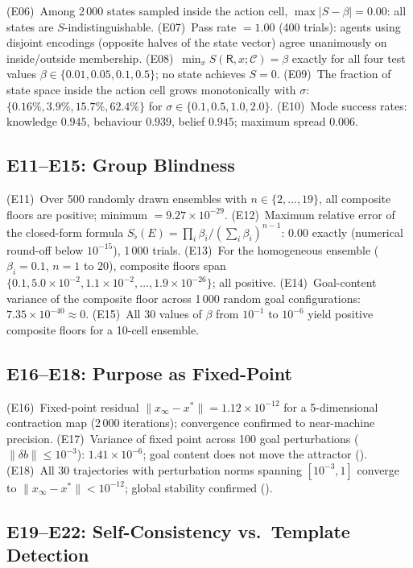 \documentclass[twocolumn,11pt,a4paper]{article}
\newcommand{\Sfloor}{S_{\flat}}
\newcommand{\receiver}{\mathsf{R}}
\newcommand{\Cell}{\mathcal{C}}
\begin{document}
(E06)~Among 2\,000 states sampled inside the action cell,
$\max|S - \beta| = 0.00$: all states are $S$-indistinguishable.
(E07)~Pass rate $= 1.00$ (400 trials): agents using disjoint encodings
(opposite halves of the state vector) agree unanimously on inside/outside
membership.
(E08)~$\min_x S(\receiver, x; \Cell) = \beta$ exactly for all four test
values $\beta \in \{0.01, 0.05, 0.1, 0.5\}$; no state achieves $S = 0$.
(E09)~The fraction of state space inside the action cell grows
monotonically with $\sigma$:
$\{0.16\%, 3.9\%, 15.7\%, 62.4\%\}$ for $\sigma \in \{0.1, 0.5, 1.0, 2.0\}$.
(E10)~Mode success rates: knowledge $0.945$, behaviour $0.939$,
belief $0.945$; maximum spread $0.006$.

\subsection{E11--E15: Group Blindness}

(E11)~Over 500 randomly drawn ensembles with $n \in \{2,\ldots,19\}$,
all composite floors are positive; minimum $= 9.27 \times 10^{-29}$.
(E12)~Maximum relative error of the closed-form formula
$\Sfloor(E) = \prod_i\beta_i / (\sum_i\beta_i)^{n-1}$: $0.00$ exactly
(numerical round-off below $10^{-15}$), 1\,000 trials.
(E13)~For the homogeneous ensemble ($\beta_i = 0.1$, $n = 1$ to $20$),
composite floors span $\{0.1, 5.0\times10^{-2}, 1.1\times10^{-2},
\ldots, 1.9\times10^{-26}\}$; all positive.
(E14)~Goal-content variance of the composite floor across 1\,000 random
goal configurations: $7.35 \times 10^{-40} \approx 0$.
(E15)~All 30 values of $\beta$ from $10^{-1}$ to $10^{-6}$ yield
positive composite floors for a 10-cell ensemble.

\subsection{E16--E18: Purpose as Fixed-Point}

(E16)~Fixed-point residual $\|x_\infty - x^*\| = 1.12 \times 10^{-12}$
for a 5-dimensional contraction map (2\,000 iterations); convergence
confirmed to near-machine precision.
(E17)~Variance of fixed point across 100 goal perturbations
($\|\delta b\| \leq 10^{-3}$): $1.41 \times 10^{-6}$; goal content
does not move the attractor ().
(E18)~All 30 trajectories with perturbation norms spanning $[10^{-3}, 1]$
converge to $\|x_\infty - x^*\| < 10^{-12}$; global stability confirmed
().

\subsection{E19--E22: Self-Consistency vs.\ Template Detection}
\end{document}
